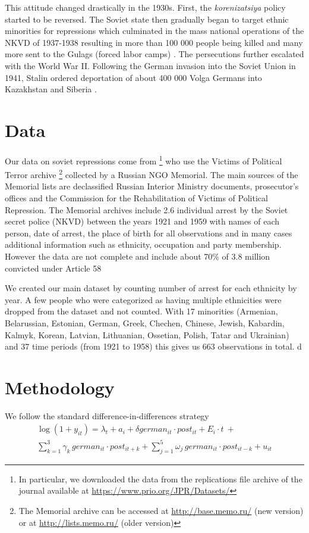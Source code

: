 \documentclass[11pt]{article}
\begin{document}
This attitude changed drastically in the 1930s. First, the  \emph{korenizatsiya} policy started to be reversed. The Soviet state then gradually  began to target ethnic minorities for repressions  which culminated in the mass national operations of the NKVD of 1937-1938 resulting in more than 100 000 people being killed and many more sent to the Gulags (forced labor camps) \citep{snyder_bloodlands:_2011}. 
The persecutions  further escalated with the World War II. Following the German invasion into the Soviet Union in 1941, Stalin ordered deportation of about 400 000 Volga Germans into Kazakhstan and Siberia \citep{polian_against_2003}.
\section{Data}
Our data on soviet repressions come from  \citet{zhukov_stalins_2018}\footnote{In particular, we downloaded the data from the replications file archive of the journal available  at \url{https://www.prio.org/JPR/Datasets/}} who use  the Victims of Political Terror archive \footnote{The Memorial archive can be accessed at \url{http://base.memo.ru/} (new version) or at \url{http://lists.memo.ru/} (older version)} collected by a Russian NGO Memorial. The main sources of the Memorial lists are declassified Russian Interior Ministry documents, prosecutor’s offices and the Commission for the Rehabilitation of Victims of Political Repression.
 The Memorial archives include 2.6 individual arrest by the Soviet secret police (NKVD) between  the years 1921 and 1959 with names of each person, date of arrest, the place of birth for all observations and  in many cases additional information such as ethnicity, occupation and party membership. 
 However the data are not complete and include about 70\% of 3.8 million convicted under Article 58

We created our main dataset by counting number of arrest for each ethnicity by year.  A few people who were categorized as having multiple ethnicities were dropped from the dataset and not counted. 
With 17  minorities (Armenian, Belarussian, Estonian, German, Greek, Chechen, Chinese, Jewish, Kabardin, Kalmyk, Korean, Latvian, Lithuanian, Ossetian, Polish, Tatar and Ukrainian) and 37 time periods (from 1921 to 1958) this gives us 663 observations in total. d 

\section{Methodology}
We follow the standard difference-in-differences strategy
\begin{multline}
 \log\left(1 + y_{it}\right) = \lambda_t + a_i  + \delta german_{it} \cdot post_{it} + E_i \cdot t \: + \\ \sum_{k= 1}^3 \gamma_k \, german_{it} \cdot post_{it+ k} + \sum_{j= 1}^5 \omega_j \, german_{it} \cdot post_{it - k}  + u_{it}   
\end{multline}
\end{document}
